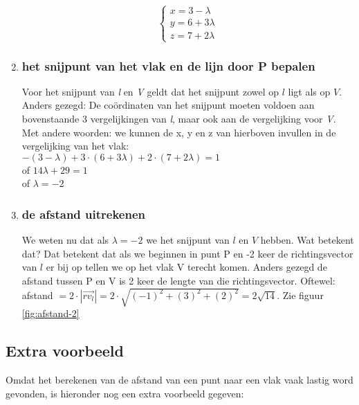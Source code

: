 \begin{enumerate}[label=(\alph*)]
\[\begin{cases}
x =  3 -\lambda \\
y =  6 + 3\lambda\\
z = 7 + 2\lambda
\end{cases}
\] 
\item \subsubsection{het snijpunt van  het  vlak en de lijn door P bepalen}
Voor het snijpunt van\textit{ l} en \textit{V} geldt dat het snijpunt zowel op $  l $ ligt als op $ V $. Anders gezegd: De coördinaten  van het snijpunt moeten voldoen aan bovenstaande 3 vergelijkingen van\textit{ l}, maar ook aan de vergelijking voor \textit{V}. Met andere woorden: we kunnen de x, y en z van hierboven invullen in de vergelijking van het vlak:\\
$ -(3 -\lambda) + 3\cdot(6 + 3\lambda) + 2\cdot(7 + 2\lambda) = 1$ \\
of $ 14\lambda + 29 = 1 $ \\of $  \lambda = -2 $

\item \subsubsection{de afstand uitrekenen}
We weten nu dat als $  \lambda = -2 $ we het snijpunt van $ l  $ en $ V $ hebben. Wat betekent dat? Dat betekent dat als we beginnen in punt P en -2 keer de richtingsvector van $  l $ er bij op tellen we op het vlak V terecht komen.
Anders gezegd de afstand tussen P en V is 2 keer de lengte van die richtingsvector. Oftewel: 
afstand $ = 2\cdot |\overrightarrow{rv_{l}}| = 2\cdot \sqrt{(-1)^{2} + (3)^{2} + (2)^{2} } = 2\sqrt{14} $. Zie  figuur  \ref{fig:afstand-2}
\end{enumerate}	


\newpage 
\subsection{Extra voorbeeld}
Omdat het berekenen van de afstand van een punt naar een vlak vaak lastig word gevonden, is hieronder nog een extra voorbeeld gegeven: \\

